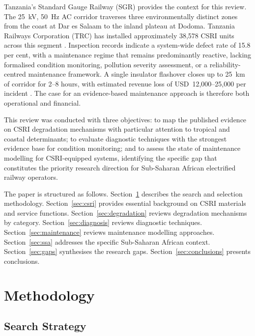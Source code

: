 \documentclass[preprint,12pt,3p]{elsarticle}
\begin{document}
Tanzania's Standard Gauge Railway (SGR) provides the context for this review.
The 25~kV, 50~Hz AC corridor traverses three environmentally distinct zones
from the coast at Dar es Salaam to the inland plateau at Dodoma. Tanzania
Railways Corporation (TRC) has installed approximately 38,578 CSRI units
across this segment \cite{TRCInspection2025}. Inspection records indicate a
system-wide defect rate of 15.8 per cent, with a maintenance regime that
remains predominantly reactive, lacking formalised condition monitoring,
pollution severity assessment, or a reliability-centred maintenance framework.
A single insulator flashover closes up to 25~km of corridor for 2--8 hours,
with estimated revenue loss of USD~12,000--25,000 per incident
\cite{TRCInspection2025}. The case for an evidence-based maintenance approach
is therefore both operational and financial.

This review was conducted with three objectives: to map the published evidence
on CSRI degradation mechanisms with particular attention to tropical and
coastal determinants; to evaluate diagnostic techniques with the strongest
evidence base for condition monitoring; and to assess the state of maintenance
modelling for CSRI-equipped systems, identifying the specific gap that
constitutes the priority research direction for Sub-Saharan African electrified
railway operators.

The paper is structured as follows. Section~\ref{sec:methods} describes
the search and selection methodology. Section~\ref{sec:csri} provides
essential background on CSRI materials and service functions.
Section~\ref{sec:degradation} reviews degradation mechanisms by category.
Section~\ref{sec:diagnosis} reviews diagnostic techniques. Section~\ref{sec:maintenance}
reviews maintenance modelling approaches. Section~\ref{sec:ssa} addresses
the specific Sub-Saharan African context. Section~\ref{sec:gaps}
synthesises the research gaps. Section~\ref{sec:conclusions} presents
conclusions.


\section{Methodology}
\label{sec:methods}

\subsection{Search Strategy}
\end{document}
